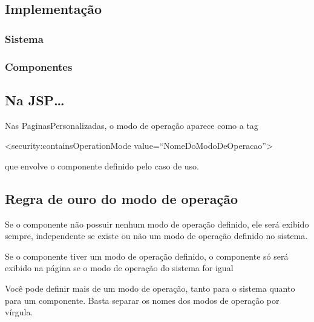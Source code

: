 \subsection{Implementação}

\subsubsection{Sistema}

\subsubsection{Componentes}

\subsection{Na JSP\ldots}

Nas PaginasPersonalizadas, o modo de operação aparece como a tag

<security:containsOperationMode value=“NomeDoModoDeOperacao”>

que envolve o componente definido pelo caso de uso.


\subsection{Regra de ouro do modo de operação}

    Se o componente não possuir nenhum modo de operação definido, ele será
    exibido sempre,  independente se existe ou não um modo de operação definido no sistema.
    
    Se o componente tiver um modo de operação definido,  o componente só será
    exibido na página se o modo de operação do sistema for igual
    
    Você pode definir mais de um modo de operação,  tanto para o sistema quanto
    para um componente. Basta separar os nomes dos modos de operação por vírgula.

